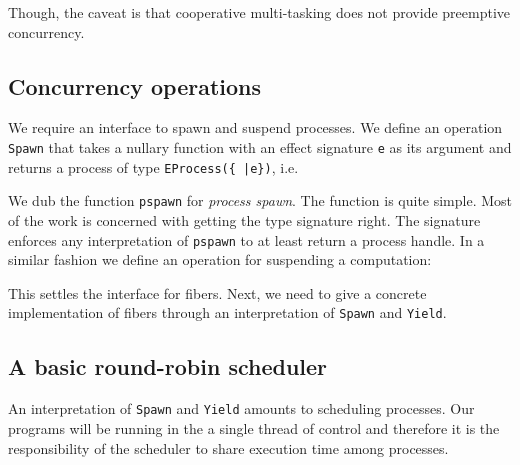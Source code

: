 \documentclass[12pt,mscres,cdtppar,twoside,openright,logo,rightchapter,normalheadings]{infthesis}
\newcommand{\snippet}[1]{}
\theoremstyle{definition}
\newcommand{\todo}[1]{{\par\noindent\small\color{red} \framebox{\parbox{\dimexpr\linewidth-2\fboxsep-2\fboxrule}{\textbf{TODO:} #1}}}}
\begin{document}
\todo{Introduce fibers} 
%
Though, the caveat is that cooperative
multi-tasking does not provide preemptive concurrency.

\subsection{Concurrency operations}

We require an interface to spawn and suspend processes. We define an
operation \lstinline$Spawn$ that takes a nullary function with an
effect signature \lstinline$e$ as its argument and returns a process
of type \lstinline$EProcess({ |e})$, i.e.
%
\snippet{pspawn.links}
%
We dub the function \lstinline$pspawn$ for \emph{process spawn}. The
function is quite simple. Most of the work is concerned with getting
the type signature right. The signature enforces any interpretation of
\lstinline$pspawn$ to at least return a process handle. In a similar
fashion we define an operation for suspending a computation:
%
\snippet{yield.links}
%
This settles the interface for fibers. Next, we need to give a
concrete implementation of fibers through an interpretation of
\lstinline$Spawn$ and \lstinline$Yield$.

\subsection{A basic round-robin scheduler}

An interpretation of \lstinline$Spawn$ and \lstinline$Yield$ amounts
to scheduling processes. Our programs will be running in the a single
thread of control and therefore it is the responsibility of the
scheduler to share execution time among processes.
\end{document}
